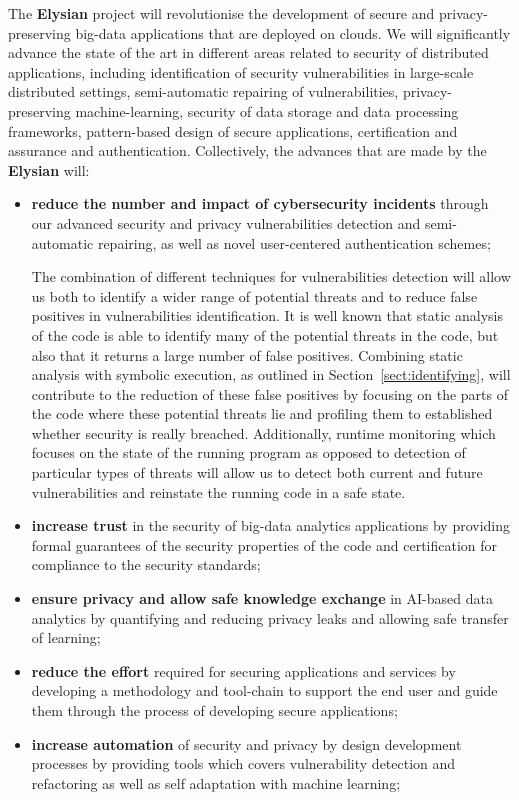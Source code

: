 \documentclass[a4paper,11pt]{article}
\newcommand{\project}[1]{\textbf{#1}\xspace}
\newcommand{\SECURITY}{\project{Elysian}}
\newcommand{\TheProject}{\SECURITY}
\begin{document}
The \TheProject{} project will revolutionise the development of secure and privacy-preserving big-data applications that are deployed on clouds. We will significantly advance the state of the art in different areas related to security of distributed applications, including identification of security vulnerabilities in large-scale distributed settings, semi-automatic repairing of vulnerabilities, privacy-preserving machine-learning, security of data storage and data processing frameworks, pattern-based design of secure applications, certification and assurance and authentication. Collectively, the advances that are made by the \TheProject{} will:
\begin{itemize}
\item \textbf{reduce the number and impact of cybersecurity incidents} through our advanced security and privacy vulnerabilities detection and semi-automatic repairing, as well as novel user-centered authentication schemes;

\begin{mdframed}[backgroundcolor=blue!5]
The combination of different techniques for vulnerabilities detection will allow us both to identify a wider range of potential threats and to reduce false positives in vulnerabilities identification. It is well known that static analysis of the code is able to identify many of the potential threats in the code, but also that it returns a large number of false positives. Combining static analysis with symbolic execution, as outlined in Section~\ref{sect:identifying}, will contribute to the reduction of these false positives by focusing on the parts of the code where these potential threats lie and profiling them to established whether security is really breached. Additionally, runtime monitoring which focuses on the state of the running program as opposed to detection of particular types of threats will allow us to detect both current and future vulnerabilities and reinstate the running code in a safe state.
\end{mdframed}

\item \textbf{increase trust} in the security of big-data analytics applications by providing formal guarantees of the security properties of the code and certification for compliance to the security standards;
\item \textbf{ensure privacy and allow safe knowledge exchange} in AI-based data analytics by quantifying and reducing privacy leaks and allowing safe transfer of learning;
\item \textbf{reduce the effort} required for securing applications and services by developing a methodology and tool-chain to support the end user and guide them through the process of developing secure applications;
\item \textbf{increase automation}  of security and privacy by design development processes by providing tools which covers vulnerability detection and refactoring as well as self adaptation with machine learning;


\end{itemize}
\end{document}
